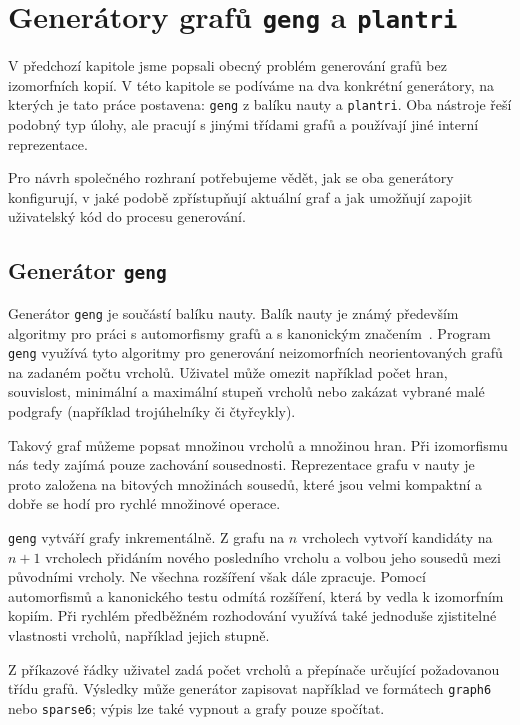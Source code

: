 \chapter{Generátory grafů \texttt{geng} a \texttt{plantri}}
\label{chap:generators}

V předchozí kapitole jsme popsali obecný problém generování grafů bez izomorfních
kopií. V této kapitole se podíváme na dva konkrétní generátory, na kterých je tato práce
postavena: \texttt{geng} z balíku nauty a \texttt{plantri}. Oba nástroje řeší podobný
typ úlohy, ale pracují s jinými třídami grafů a používají jiné interní reprezentace.

Pro návrh společného rozhraní potřebujeme vědět, jak se oba generátory
konfigurují, v jaké podobě zpřístupňují aktuální graf a jak umožňují zapojit
uživatelský kód do procesu generování.

\section{Generátor \texttt{geng}}
\label{sec:geng}

Generátor \texttt{geng} je součástí balíku nauty. Balík nauty je známý především
algoritmy pro práci s automorfismy grafů a s kanonickým značením~\cite{mckay2014practical}.
Program \texttt{geng} využívá tyto algoritmy pro generování neizomorfních neorientovaných
grafů na zadaném počtu vrcholů. Uživatel může omezit například počet hran, souvislost,
minimální a maximální stupeň vrcholů nebo zakázat vybrané malé podgrafy
(například trojúhelníky či čtyřcykly).

Takový graf můžeme popsat množinou vrcholů a množinou hran. Při izomorfismu nás
tedy zajímá pouze zachování sousednosti. Reprezentace grafu v nauty je proto
založena na bitových množinách
sousedů, které jsou velmi kompaktní a dobře se hodí pro rychlé množinové operace.

\texttt{geng} vytváří grafy inkrementálně. Z grafu na \(n\) vrcholech vytvoří
kandidáty na \(n+1\) vrcholech přidáním nového posledního vrcholu a volbou
jeho sousedů mezi původními vrcholy. Ne všechna rozšíření však dále zpracuje.
Pomocí automorfismů a kanonického testu odmítá rozšíření, která by vedla
k izomorfním kopiím. Při rychlém předběžném rozhodování využívá také jednoduše
zjistitelné vlastnosti vrcholů, například jejich stupně.

Z příkazové řádky uživatel zadá počet vrcholů a přepínače určující požadovanou
třídu grafů. Výsledky může generátor zapisovat například ve formátech
\texttt{graph6} nebo \texttt{sparse6}; výpis lze také vypnout a grafy pouze
spočítat.

